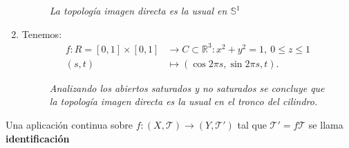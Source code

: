 \begin{ej}
\begin{enumerate}
\begin{figure}[H]
        \caption{\textit{La topología imagen directa es la usual en $\mathbb{S}^1$}}
        \label{fig:proyeccion_exponencial_img_directa}
    \end{figure}

    \item Tenemos:
    \begin{align*}
        f: R = \left[ 0, 1 \right] \times \left[ 0, 1 \right] &\rightarrow C \subset \mathbb{R}^3: x^2 + y^2 = 1,\ 0 \le z \le 1\\
        \left( s, t \right) &\mapsto \left( \cos 2\pi s, \sin 2\pi s, t \right) 
    .\end{align*}

\begin{figure}[H]
    \centering
    \caption{\textit{Analizando los abiertos saturados y no saturados se concluye que la topología imagen directa es la usual en el tronco del cilindro.}}
    \label{fig:rectángulo-a-cilindro-por-imagen-directa.}
\end{figure}
\end{enumerate}
\end{ej}

\begin{defi}
Una aplicación continua sobre $f: \left( X, \mathcal{T} \right) \rightarrow \left( Y, \mathcal{T}' \right)$ tal que $\mathcal{T}' = f\mathcal{T}$ se llama \textbf{identificación} 
\end{defi}

